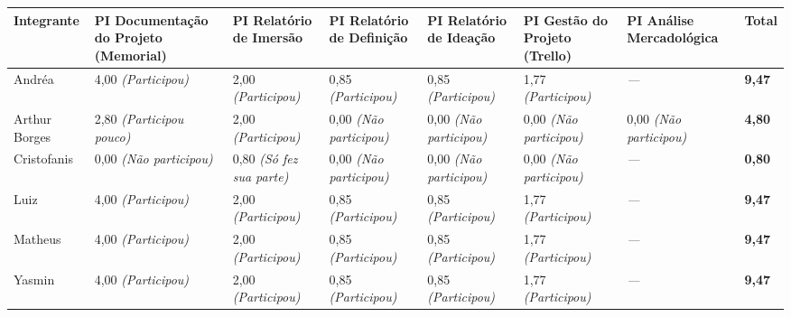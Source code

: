 \documentclass[
  sigconf,
  nonacm, %
  language=portuguese
]{acmart}
\begin{document}
\begin{tabularx}{\linewidth}{@{} X X X X X X X p{2.5cm} @{}}
\toprule
\textbf{Integrante} & \textbf{\small PI Documentação do Projeto (Memorial)} & \textbf{\small PI Relatório de Imersão} & \textbf{\small PI Relatório de Definição} & \textbf{\small PI Relatório de Ideação} & \textbf{\small PI Gestão do Projeto (Trello)} & \textbf{\small PI Análise Mercadológica} & \textbf{Total} \\
\midrule
Andréa & 4,00 \textit{(Participou)} & 2,00 \textit{(Participou)} & 0,85 \textit{(Participou)} & 0,85 \textit{(Participou)} & 1,77 \textit{(Participou)} & \textit{---} & \textbf{9,47} \\
Arthur Borges & 2,80 \textit{(Participou pouco)} & 2,00 \textit{(Participou)} & 0,00 \textit{(Não participou)} & 0,00 \textit{(Não participou)} & 0,00 \textit{(Não participou)} & 0,00 \textit{(Não participou)} & \textbf{4,80} \\
Cristofanis & 0,00 \textit{(Não participou)} & 0,80 \textit{(Só fez sua parte)} & 0,00 \textit{(Não participou)} & 0,00 \textit{(Não participou)} & 0,00 \textit{(Não participou)} & \textit{---} & \textbf{0,80} \\
Luiz & 4,00 \textit{(Participou)} & 2,00 \textit{(Participou)} & 0,85 \textit{(Participou)} & 0,85 \textit{(Participou)} & 1,77 \textit{(Participou)} & \textit{---} & \textbf{9,47} \\
Matheus & 4,00 \textit{(Participou)} & 2,00 \textit{(Participou)} & 0,85 \textit{(Participou)} & 0,85 \textit{(Participou)} & 1,77 \textit{(Participou)} & \textit{---} & \textbf{9,47} \\
Yasmin & 4,00 \textit{(Participou)} & 2,00 \textit{(Participou)} & 0,85 \textit{(Participou)} & 0,85 \textit{(Participou)} & 1,77 \textit{(Participou)} & \textit{---} & \textbf{9,47} \\
\bottomrule
\end{tabularx}
\end{document}
